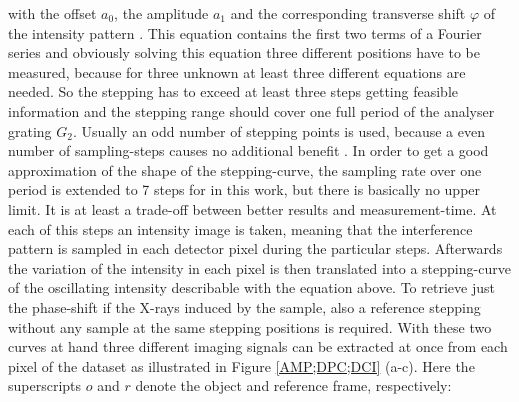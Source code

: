 with the offset $a_{0}$, the amplitude $a_{1}$ and the corresponding transverse shift $\varphi$ of the intensity pattern \citep{Bech2009}. This equation contains the first two terms of a Fourier series and obviously solving this equation three different positions have to be measured, because for three unknown at least three different equations are needed. So the stepping has to exceed at least three steps getting feasible information and the stepping range should cover one full period of the analyser grating $G_{2}$. Usually an odd number of stepping points is used, because a even number of sampling-steps causes no additional benefit \citep{Bech2009}. In order to get a good approximation of the shape of the stepping-curve, the sampling rate over one period is extended to 7 steps for in this work, but there is basically no upper limit. It is at least a trade-off between better results and measurement-time. At each of this steps an intensity image is taken, meaning that the interference pattern is sampled in each detector pixel during the particular steps. Afterwards the variation of the intensity in each pixel is then translated into a stepping-curve of the oscillating intensity describable with the equation above. To retrieve just the phase-shift if the X-rays induced by the sample, also a reference stepping without any sample at the same stepping positions is required. With these two curves at hand three different imaging signals can be extracted at once from each pixel of the dataset as illustrated in Figure \ref{AMP;DPC;DCI} (a-c). Here the superscripts $o$ and $r$ denote the object and reference frame, respectively:
